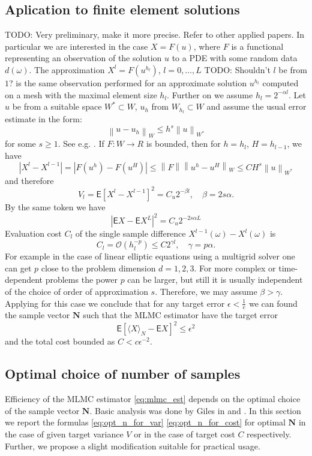 \documentclass{article}
\def\vc#1{\mathbf{\boldsymbol{#1}}}     %
\def \E{{\mathsf E}}
\newcommand{\norm}[1]{\left\lVert#1\right\rVert}
\def\todo#1{{\color{red}TODO: #1}}
\def\avg#1{\langle#1\rangle}
\def\abs#1{|#1|}
\begin{document}
\subsection{Aplication to finite element solutions}
\todo{Very preliminary, make it more precise. Refer to other applied papers.}
In particular we are interested in the case $X=F(u)$, where $F$ is a functional representing an observation of
the solution $u$ to a PDE with some random data $d(\omega)$. The approximation $X^l = F(u^{h_l})$, $l=0,\dots,L$ \todo{Shouldn't $l$ be from $1$? } is the same observation performed for an approximate solution $u^{h_l}$ computed on a mesh with the maximal element size $h_l$. Further on we assume $h_l = 2^{-\alpha l}$. Let $u$ be from a suitable space 
$W^* \subset W$, $u_h$ from $W_{h_l} \subset W$ and assume the usual error estimate in the form:
\[
	\norm{u - u_h}_{W} \le h^s \norm{u}_{W^*}
\] 
for some $s\ge 1$. See e.g. \cite{Evans1998}.
If $F:W \to R$ is bounded, then for $h=h_l$, $H=h_{l-1}$, we have
\[
	\abs{X^l - X^{l-1}} = \abs{F(u^h) - F(u^H)} \le \norm{F}\norm{u^h - u^H}_W \le C H^s\norm{u}_{W^*}
\]
and therefore 
\begin{equation}
    \label{eq:level_var_pde_est}
    V_l =  \E[X^l - X^{l-1}]^2 = C_u 2^{-\beta l},\quad \beta = 2s\alpha.
\end{equation}
By the same token we have 
\begin{equation}
    \label{eq:aprox_pde_est}
    \abs{\E X - \E X^L}^2 = C_u 2^{-2s\alpha L}
\end{equation}
Evaluation cost $C_l$ of the single sample difference $X^{l-1}(\omega) - X^l(\omega)$ is
\[
  C_l = \mathcal O( h_l^{-p}) \le C 2^{\gamma l}, \quad \gamma = p\alpha.
\]
For example in the case of linear elliptic equations using a multigrid solver one can get $p$ close to the problem dimension $d=1,2,3$. For more complex or time-dependent problems the power $p$ can be larger, but 
still it is usually independent of the choice of order of approximation $s$. Therefore, we may assume
$\beta > \gamma$. Applying \cite[Theorem 1]{Giles2015} for this case we conclude that for any target error 
$\epsilon< \frac{1}{e}$ we can found the sample vector $\vc N$ such that the MLMC estimator have the target error
\[
  \E[\avg{X}_N - \E X]^2 \le \epsilon^2
\]
and the total cost bounded as $C < c \epsilon^{-2}$.


\subsection{Optimal choice of number of samples}
Efficiency of the MLMC estimator \eqref{eq:mlmc_est} depends on the optimal choice of the sample vector $\vc N$. Basic analysis was done by Giles in \cite{Giles2008} and \cite{Giles2015}. In this section we report the formulas \eqref{eq:opt_n_for_var} \eqref{eq:opt_n_for_cost} for optimal $\vc N$ in the case of given target variance $V$ or in the case of target cost $C$ respectively. Further, we propose a slight modification suitable for practical usage.
\end{document}

